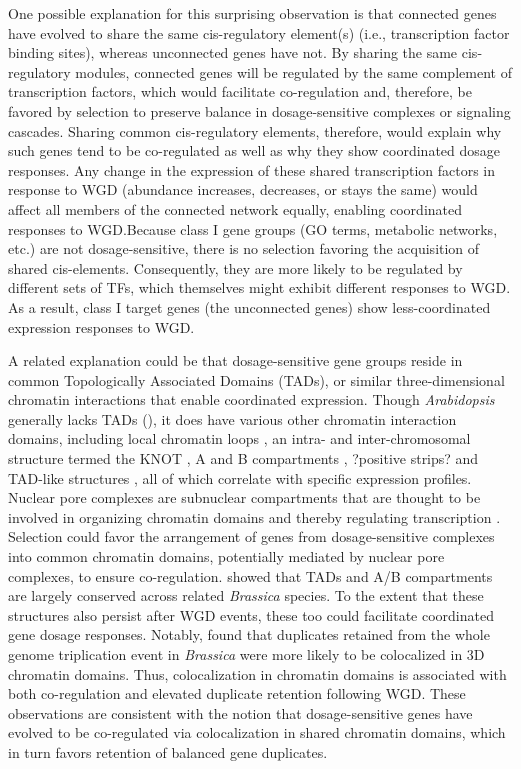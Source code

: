 \documentclass[11pt]{article}
\begin{document}
One possible explanation for this surprising observation is that connected genes have evolved to share the same cis-regulatory element(s) (i.e., transcription factor binding sites), whereas unconnected genes have not. By sharing the same cis-regulatory modules, connected genes will be regulated by the same complement of transcription factors, which would facilitate co-regulation and, therefore, be favored by selection to preserve balance in dosage-sensitive complexes or signaling cascades. Sharing common cis-regulatory elements, therefore, would explain why such genes tend to be co-regulated as well as why they show coordinated dosage responses. Any change in the expression of these shared transcription factors in response to WGD (abundance increases, decreases, or stays the same) would affect all members of the connected network equally, enabling coordinated responses to WGD.Because class I gene groups (GO terms, metabolic networks, etc.) are not dosage-sensitive, there is no selection favoring the acquisition of shared cis-elements. Consequently, they are more likely to be regulated by different sets of TFs, which themselves might exhibit different responses to WGD. As a result, class I target genes (the unconnected genes) show less-coordinated expression responses to WGD.

A related explanation could be that dosage-sensitive gene groups reside in common Topologically Associated Domains (TADs), or similar three-dimensional chromatin interactions that enable coordinated expression. Though {\it Arabidopsis} generally lacks TADs (\citep{liu2017}), it does have various other chromatin interaction domains, including local chromatin loops \citep{liu2017}, an intra- and inter-chromosomal structure termed the KNOT \citep{grob2014, grob2017}, A and B compartments \citep{grob2014}, ?positive strips? and TAD-like structures \citep{wang2015}, all of which  correlate with specific expression profiles. Nuclear pore complexes are subnuclear compartments that are thought to be involved in organizing chromatin domains and thereby regulating transcription \citep{sun2019}. Selection could favor the arrangement of genes from dosage-sensitive complexes into common chromatin domains, potentially mediated by nuclear pore complexes, to ensure co-regulation. \cite{xie2019} showed that TADs and A/B compartments are largely conserved across related {\it Brassica} species. To the extent that these structures also persist after WGD events, these too could facilitate coordinated gene dosage responses. Notably, \cite{xie2019} found that duplicates retained from the whole genome triplication event in {\it Brassica} were more likely to be colocalized in 3D chromatin domains. Thus, colocalization in chromatin domains is associated with both co-regulation and elevated duplicate retention following WGD. These observations are consistent with the notion that dosage-sensitive genes have evolved to be co-regulated via colocalization in shared chromatin domains, which in turn favors retention of balanced gene duplicates.
\end{document}
